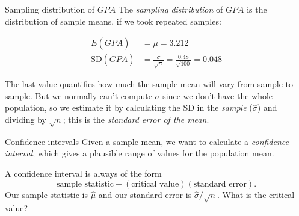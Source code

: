 \documentclass{beamer}\usepackage[]{graphicx}\usepackage[]{color}
\makeatletter
\newcommand{\hlnum}[1]{\textcolor[rgb]{0.824,0.412,0.118}{#1}}%
\newcommand{\hlstr}[1]{\textcolor[rgb]{1,0.894,0.71}{#1}}%
\newcommand{\hlopt}[1]{\textcolor[rgb]{1,0.894,0.769}{#1}}%
\newcommand{\hlstd}[1]{\textcolor[rgb]{1,0.894,0.769}{#1}}%
\newcommand{\hlkwb}[1]{\textcolor[rgb]{0.804,0.776,0.451}{#1}}%
\newcommand{\hlkwc}[1]{\textcolor[rgb]{0.78,0.941,0.545}{#1}}%
\newcommand{\hlkwd}[1]{\textcolor[rgb]{1,0.78,0.769}{#1}}%
\newenvironment{kframe}{%
 \def\at@end@of@kframe{}%
 \ifinner\ifhmode%
  \def\at@end@of@kframe{\end{minipage}}%
  \begin{minipage}{\columnwidth}%
 \fi\fi%
 \def\FrameCommand##1{\hskip\@totalleftmargin \hskip-\fboxsep
 \colorbox{shadecolor}{##1}\hskip-\fboxsep
     \hskip-\linewidth \hskip-\@totalleftmargin \hskip\columnwidth}%
 \MakeFramed {\advance\hsize-\width
   \@totalleftmargin\z@ \linewidth\hsize
   \@setminipage}}%
 {\par\unskip\endMakeFramed%
 \at@end@of@kframe}
\newenvironment{knitrout}{}{} %
\makeatother
\begin{document}
\begin{darkframes}


\begin{frame}[fragile]{Sampling distribution of $\overline{GPA}$}
The \emph{sampling distribution} of $\overline{GPA}$ is the distribution of sample means, if we took repeated samples:

\begin{align*}
  E(\overline{GPA}) &= \mu = 3.212 \\
  \text{SD}(\overline{GPA}) &= \frac{\sigma}{\sqrt n} = \frac{0.48}{\sqrt{100}} = 0.048
\end{align*}

The last value quantifies how much the sample mean will vary from sample to sample. But we normally can't compute $\sigma$ since we don't have the whole population, so we estimate it by calculating the SD in the \emph{sample} ($\hat\sigma$) and dividing by $\sqrt n$; this is the \emph{standard error of the mean}.
\end{frame}


\begin{frame}{Confidence intervals}
Given a sample mean, we want to calculate a \emph{confidence interval}, which gives a plausible range of values for the population mean.
\pause

A confidence interval is always of the form
\[
  \text{sample statistic} \pm (\text{critical value})(\text{standard error}).
\]
\pause
Our sample statistic is $\hat\mu$ and our standard error is $\hat\sigma/\sqrt n$.
\pause
What is the critical value?
\end{frame}



\end{darkframes}
\end{document}
